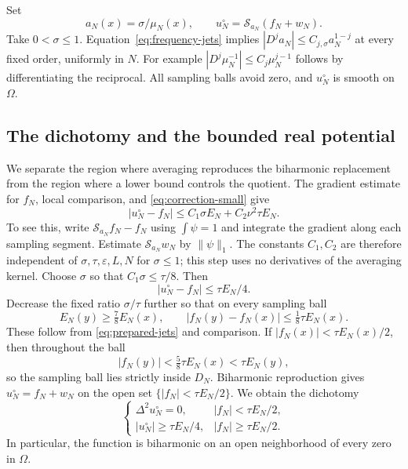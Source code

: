 \documentclass[11pt,twoside,leqno]{article}
\numberwithin{equation}{section}
\theoremstyle{definition}
\theoremstyle{remark}
\newcommand{\eps}{\varepsilon}
\newcommand{\Om}{\Omega}
\begin{document}
Set
\begin{equation}\label{eq:smoothed}
 a_N(x)=\sigma/\mu_N(x),\qquad
 u_N^\circ=\mathcal S_{a_N}(f_N+w_N).
\end{equation}
Take $0<\sigma\le1$. Equation~\eqref{eq:frequency-jets} implies
$|D^ja_N|\le C_{j,\sigma}a_N^{1-j}$ at every fixed order, uniformly
in $N$. For example $|D^j\mu_N^{-1}|\le C_j\mu_N^{j-1}$ follows
by differentiating the reciprocal. All sampling balls avoid zero,
and $u_N^\circ$ is smooth on $\Om$.

\subsection{The dichotomy and the bounded real potential}

We separate the region where averaging reproduces the biharmonic
replacement from the region where a lower bound controls the quotient.
The gradient estimate for $f_N$, local comparison, and
\eqref{eq:correction-small} give
\begin{equation}\label{eq:closeness}
 |u_N^\circ-f_N|\le C_1\sigma E_N+C_2\nu^2\tau E_N.
\end{equation}
To see this, write $\mathcal S_{a_N}f_N-f_N$ using $\int\psi=1$
and integrate the gradient along each sampling segment. Estimate
$\mathcal S_{a_N}w_N$ by $\|\psi\|_1$.
The constants $C_1,C_2$ are therefore independent of
$\sigma,\tau,\eps,L,N$ for $\sigma\le1$; this step uses no
derivatives of the averaging kernel.
Choose $\sigma$ so that $C_1\sigma\le\tau/8$. Then
\begin{equation}\label{eq:quarter-close}
 |u_N^\circ-f_N|\le\tau E_N/4.
\end{equation}
Decrease the fixed ratio $\sigma/\tau$ further so that on every
sampling ball
\[
 E_N(y)\ge\tfrac78E_N(x),\qquad
 |f_N(y)-f_N(x)|\le\tfrac18\tau E_N(x).
\]
These follow from \eqref{eq:prepared-jets} and comparison.
If $|f_N(x)|<\tau E_N(x)/2$, then throughout the ball
\[
 |f_N(y)|<\tfrac58\tau E_N(x)<\tau E_N(y),
\]
so the sampling ball lies strictly inside $D_N$. Biharmonic
reproduction gives $u_N^\circ=f_N+w_N$ on the open set
$\{|f_N|<\tau E_N/2\}$. We obtain the dichotomy
\begin{equation}\label{eq:dichotomy}
 \begin{cases}
 \Delta^2u_N^\circ=0,& |f_N|<\tau E_N/2,\\
 |u_N^\circ|\ge\tau E_N/4,& |f_N|\ge\tau E_N/2.
 \end{cases}
\end{equation}
In particular, the function is biharmonic on an open neighborhood of
every zero in $\Om$.
\end{document}

